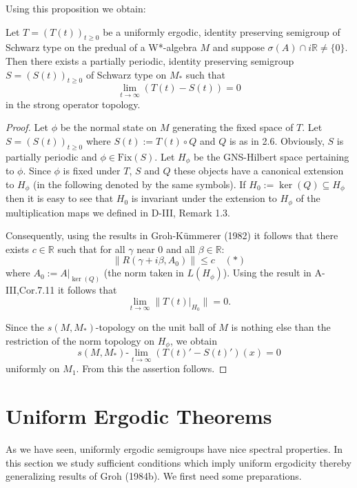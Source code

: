 Using this proposition we obtain:

\begin{theorem}\label{thm:d4-3-11}
Let \(T = (T(t))_{t \geq 0}\) be a uniformly ergodic, identity preserving semigroup of Schwarz type on the predual of a W*-algebra \(M\) and suppose \(\sigma(A) \cap i\mathbb{R} \neq \{0\}\).
Then there exists a partially periodic, identity preserving semigroup \(S = (S(t))_{t \geq 0}\) of Schwarz type on \(M_{*}\) such that
\[
\lim_{t \to \infty} (T(t) - S(t)) = 0
\]
in the strong operator topology.
\end{theorem}

\begin{proof}
Let \(\phi\) be the normal state on \(M\) generating the fixed space of \(T\).
Let \(S = (S(t))_{t \geq 0}\) where \(S(t) := T(t) \circ Q\) and \(Q\) is as in 2.6.
Obviously, \(S\) is partially periodic and \(\phi \in \text{Fix}(S)\).
Let \(H_{\phi}\) be the GNS-Hilbert space pertaining to \(\phi\).
Since \(\phi\) is fixed under \(T\), \(S\) and \(Q\) these objects have a canonical extension to \(H_{\phi}\) (in the following denoted by the same symbols).
If \(H_{0} := \ker(Q) \subseteq H_{\phi}\) then it is easy to see that \(H_{0}\) is invariant under the extension to \(H_{\phi}\) of the multiplication maps we defined in D-III, Remark 1.3.

Consequently, using the results in Groh-Kümmerer (1982) it follows that there exists \(c \in \mathbb{R}\) such that for all \(\gamma\) near \(0\) and all \(\beta \in \mathbb{R}\):
\[
\|R(\gamma + i\beta,A_{0})\| \leq c \quad (*)
\]
where \(A_{0} := A|_{\ker(Q)}\) (the norm taken in \(L(H_{\phi})\)).
Using the result in A-III,Cor.7.11 it follows that
\[
\lim_{t \to \infty} \|T(t)|_{H_{0}}\| = 0.
\]

Since the \(s(M,M_{*})\)-topology on the unit ball of \(M\) is nothing else than the restriction of the norm topology on \(H_{\phi}\), we obtain
\[
s(M,M_{*})\text{-}\lim_{t \to \infty} (T(t)' - S(t)')(x) = 0
\]
uniformly on \(M_{1}\).
From this the assertion follows.
\end{proof}

\newpage

\section{Uniform Ergodic Theorems}

As we have seen, uniformly ergodic semigroups have nice spectral properties.
In this section we study sufficient conditions which imply uniform ergodicity thereby generalizing results of Groh (1984b).
We first need some preparations.

